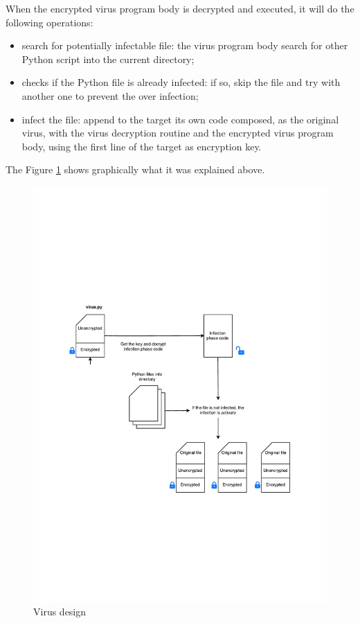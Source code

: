 \documentclass[a4paper,11pt]{article}
\begin{document}
When the encrypted virus program body is decrypted and executed, it will do the following operations:
\begin{itemize}
\item search for potentially infectable file: the virus program body search for other Python script into the current directory;
\item checks if the Python file is already infected: if so, skip the file and try with another one to prevent the over infection;
\item infect the file: append to the target its own code composed, as the original virus, with the virus decryption routine and the encrypted virus program body, using the first line of the target as encryption key.
\end{itemize}

The Figure \ref{fig:mission} shows graphically what it was explained above.

\begin{figure}
\centering
\includegraphics[scale=0.8]{img/virus-design}
\caption{Virus design\label{fig:mission}}
\end{figure}
\end{document}
